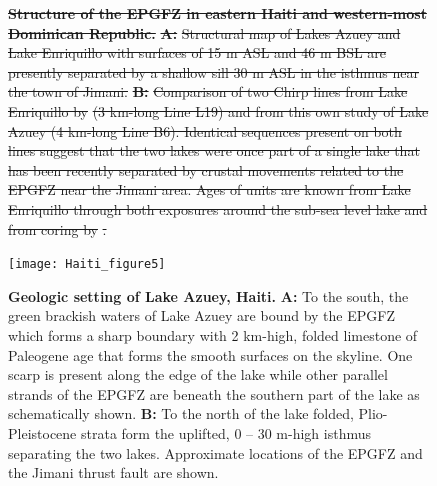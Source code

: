 \documentclass[linenumbers,draft]{agujournal}
\providecommand{\DIFdel}[1]{{\protect\color{red}\sout{#1}}}                      %
\providecommand{\DIFdelFL}[1]{\DIFdel{#1}} %
\providecommand{\DIFdelbeginFL}{} %
\providecommand{\DIFdelendFL}{} %
\begin{document}
\begin{figure}
\centering
\DIFdelbeginFL %
{%
\textbf{\DIFdelFL{Structure of the EPGFZ in eastern Haiti and western-most Dominican Republic.}} %
\textbf{\DIFdelFL{A:}} %
\DIFdelFL{Structural map of Lakes Azuey and Lake Enriquillo with surfaces of 15 m ASL and 46 m BSL are presently separated by a shallow sill 30 m ASL in the isthmus near the town of Jimani. }\textbf{\DIFdelFL{B:}} %
\DIFdelFL{Comparison of two Chirp lines from Lake Enriquillo by }%
\DIFdelFL{(3 km-long Line L19) and from this own study of Lake Azuey (4 km-long Line B6). Identical sequences present on both lines suggest that the two lakes were once part of a single lake that has been recently separated by crustal movements related to the EPGFZ near the Jimani area. Ages of units are known from Lake Enriquillo through both exposures around the sub-sea level lake and from coring by }%
\DIFdelFL{.}}

\DIFdelendFL \texttt{[image: Haiti\_figure5]}
\caption{\textbf{Geologic setting of Lake Azuey, Haiti.} \textbf{A:} To the south, the green brackish waters of Lake Azuey are bound by the EPGFZ which forms a sharp boundary with 2 km-high, folded limestone of Paleogene age that forms the smooth surfaces on the skyline. One scarp is present along the edge of the lake while other parallel strands of the EPGFZ are beneath the southern part of the lake as schematically shown. \textbf{B:} To the north of the lake folded, Plio-Pleistocene strata form the uplifted, 0 -- 30 m-high isthmus separating the two lakes. Approximate locations of the EPGFZ and the Jimani thrust fault are shown.}
\label{figure5}
\end{figure}
\end{document}
